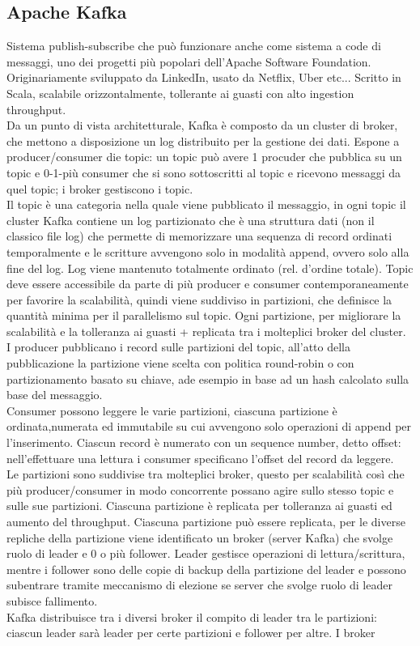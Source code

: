 \documentclass{article}
\begin{document}
\subsection{Apache Kafka}
Sistema publish-subscribe che può funzionare anche come sistema a code di messaggi, uno dei progetti più popolari dell'Apache Software Foundation.\\ Originariamente sviluppato da LinkedIn, usato da Netflix, Uber etc... Scritto in Scala, scalabile orizzontalmente, tollerante ai guasti con alto ingestion throughput.\\ Da un punto di vista architetturale, Kafka è composto da un cluster di broker, che mettono a disposizione un log distribuito per la gestione dei dati. Espone a producer/consumer die topic: un topic può avere 1 procuder che pubblica su un topic e 0-1-più consumer che si sono sottoscritti al topic e ricevono messaggi da quel topic; i broker gestiscono i topic.\\ Il topic è una categoria nella quale viene pubblicato il messaggio, in ogni topic il cluster Kafka contiene un log partizionato che è una struttura dati (non il classico file log) che permette di memorizzare una sequenza di record ordinati temporalmente e le scritture avvengono solo in modalità append, ovvero solo alla fine del log. Log viene mantenuto totalmente ordinato (rel. d'ordine totale). Topic deve essere accessibile da parte di più producer e consumer contemporaneamente per favorire la scalabilità, quindi viene suddiviso in partizioni, che definisce la quantità minima per il parallelismo sul topic. Ogni partizione, per migliorare la scalabilità e la tolleranza ai guasti + replicata tra i molteplici broker del cluster.\\ I producer pubblicano i record sulle partizioni del topic, all'atto della pubblicazione la partizione viene scelta con politica round-robin o con partizionamento basato su chiave, ade esempio in base ad un hash calcolato sulla base del messaggio. \\ Consumer possono leggere le varie partizioni, ciascuna partizione è ordinata,numerata ed immutabile su cui avvengono solo operazioni di append per l'inserimento. Ciascun record è numerato con un sequence number, detto offset: nell'effettuare una lettura i consumer specificano l'offset del record da leggere.\\ Le partizioni sono suddivise tra molteplici broker, questo per scalabilità così che più producer/consumer in modo concorrente possano agire sullo stesso topic e sulle sue partizioni. Ciascuna partizione è replicata per tolleranza ai guasti ed aumento del throughput. Ciascuna partizione può essere replicata, per le diverse repliche della partizione viene identificato un broker (server Kafka) che svolge ruolo di leader e 0 o più follower. Leader gestisce operazioni di lettura/scrittura, mentre i follower sono delle copie di backup della partizione del leader e possono subentrare tramite meccanismo di elezione se server che svolge ruolo di leader subisce fallimento.\\ Kafka distribuisce tra i diversi broker il compito di leader tra le partizioni: ciascun leader sarà leader per certe partizioni e follower per altre. I broker 
\end{document}
